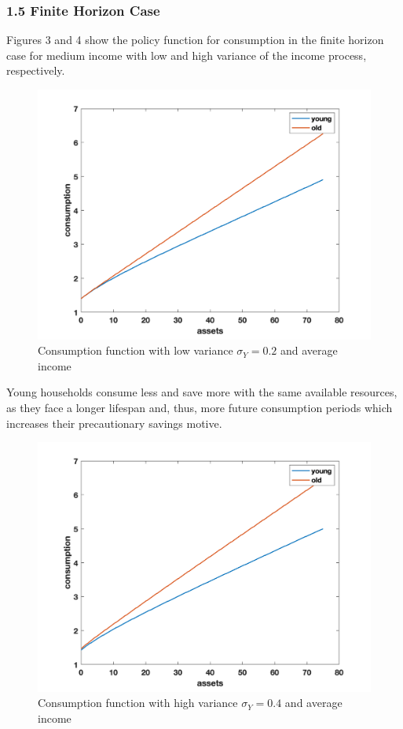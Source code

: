 \documentclass[letterpaper,12pt]{article}
\begin{document}
\subsubsection*{1.5 Finite Horizon Case}
Figures 3 and 4 show the policy function for consumption in the finite horizon case for medium income with low and high variance of the income process, respectively. \\
\begin{figure}
\includegraphics[scale=0.5]{Figures/Part1_PE/consFunc_fin_low}
\caption{Consumption function with low variance $\sigma_Y = 0.2$ and average income}
\end{figure}
Young households consume less and save more with the same available resources, as they face a longer lifespan and, thus, more future consumption periods which increases their precautionary savings motive. \\
\begin{figure}
\includegraphics[scale=0.45]{Figures/Part1_PE/consFunc_fin_high}
\caption{Consumption function with high variance $\sigma_Y = 0.4$ and average income}
\end{figure}
\end{document}
